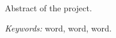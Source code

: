 \begin{foreignabstract}

Abstract of the project.

\vspace*{7mm}
\noindent \textit{Keywords:} word, word, word.

\end{foreignabstract}